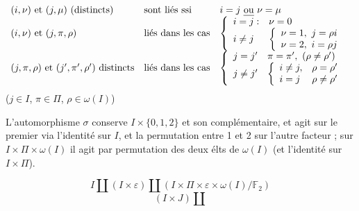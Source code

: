 \documentclass[11pt,a4paper]{article}
\begin{document}
\[
\begin{array}{lll}
(i, \nu) \text{ et } (j, \mu) \ (\text{distincts}) & \text{sont liés ssi} &
i = j \text{ \emph{ou} } \nu = \mu \\
(i, \nu) \text{ et } (j, \pi, \rho) & \text{liés dans les cas} &
\left\lbrace
\begin{array}{ll}
i = j : & \nu = 0 \\
i \neq j & \left\lbrace \begin{array}{l} \nu = 1, \ j = \rho i \\ \nu =
2, \ i = \rho j \end{array} \right.
\end{array}
\right. \\
(j, \pi, \rho) \text{ et } (j', \pi', \rho') \ \text{distincts} & \text{liés
dans les cas} &
\left\lbrace
\begin{array}{ll}
j = j' & \pi = \pi', \ (\rho \neq \rho') \\
j \neq j' & \left\lbrace \begin{array}{ll} i \neq j, & \rho = \rho' \\ i =
j & \rho \neq \rho' \end{array} \right.
\end{array}
\right.
\end{array}
\]
($j \in I$, $\pi \in \Pi$, $\rho \in \omega(I)$)

L'automorphisme $\sigma$ conserve $I \times \lbrace 0, 1, 2 \rbrace$ et son
complémentaire, et agit sur le premier via l'identité sur $I$, et la
permutation entre 1 et 2 sur l'autre facteur ; sur $I \times \Pi \times
\omega(I)$ il agit par permutation des deux \struck{\ill{}} élts de $\omega(I)$
(et l'identité sur $I \times \Pi$).


\[
I \amalg (I \times \varepsilon) \amalg (I \times \Pi \times \varepsilon
\times \omega(I)/\mathbb{F}_2)
\]
\[
(I \times J) \amalg
\]
\end{document}
